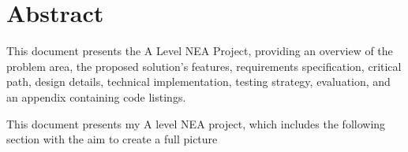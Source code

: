 \chapter{Abstract}

This document presents the A Level NEA Project, providing an overview of the problem area, the proposed solution's features, requirements specification, critical path, design details, technical implementation, testing strategy, evaluation, and an appendix containing code listings. \cite{einstein}


This document presents my A level NEA project, which includes the following section with the aim to create a full picture

